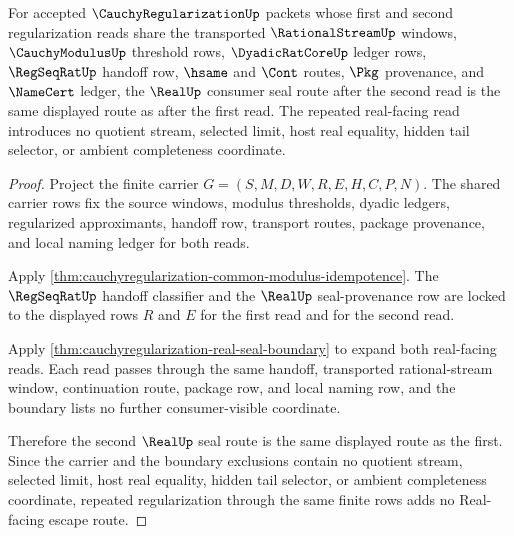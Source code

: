 \begin{theorem}
\label{thm:cauchyregularization-real-seal-idempotent-route}
For accepted $\CauchyRegularizationUp$ packets whose first and second
regularization reads share the transported $\RationalStreamUp$ windows,
$\CauchyModulusUp$ threshold rows, $\DyadicRatCoreUp$ ledger rows,
$\RegSeqRatUp$ handoff row, $\hsame$ and $\Cont$ routes, $\Pkg$
provenance, and $\NameCert$ ledger, the $\RealUp$ consumer seal route after
the second read is the same displayed route as after the first read. The
repeated real-facing read introduces no quotient stream, selected limit,
host real equality, hidden tail selector, or ambient completeness coordinate.
\end{theorem}
\begin{proof}
Project the finite carrier
$G=(S,M,D,W,R,E,H,C,P,N)$. The shared carrier rows fix the source windows,
modulus thresholds, dyadic ledgers, regularized approximants, handoff row,
transport routes, package provenance, and local naming ledger for both reads.

Apply
\autoref{thm:cauchyregularization-common-modulus-idempotence}. The
$\RegSeqRatUp$ handoff classifier and the $\RealUp$ seal-provenance row are
locked to the displayed rows $R$ and $E$ for the first read and for the
second read.

Apply \autoref{thm:cauchyregularization-real-seal-boundary} to expand both
real-facing reads. Each read passes through the same handoff, transported
rational-stream window, continuation route, package row, and local naming
row, and the boundary lists no further consumer-visible coordinate.

Therefore the second $\RealUp$ seal route is the same displayed route as the
first. Since the carrier and the boundary exclusions contain no quotient
stream, selected limit, host real equality, hidden tail selector, or ambient
completeness coordinate, repeated regularization through the same finite rows
adds no Real-facing escape route.
\end{proof}

